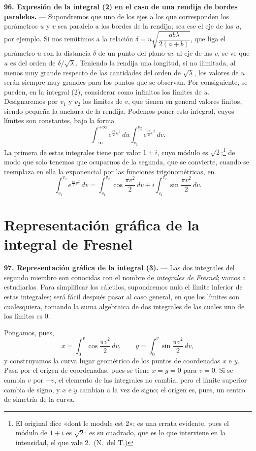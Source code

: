 \noindent\textbf{96. Expresión de la integral (2) en el caso de una
rendija de bordes paralelos.} — Supondremos que uno de los ejes a los que
corresponden los parámetros $u$ y $v$ sea paralelo a los bordes de la
rendija; sea ese el eje de las $u$, por ejemplo. Si nos remitimos a la
relación $\delta=u\sqrt{\dfrac{ab\lambda}{2(a+b)}}$, que liga el parámetro
$u$ con la distancia $\delta$ de un punto del plano $uv$ al eje de las
$v$, se ve que $u$ es del orden de $\delta/\sqrt{\lambda}$. Teniendo la
rendija una longitud, si no ilimitada, al menos muy grande respecto de las
cantidades del orden de $\sqrt{\lambda}$, los valores de $u$ serán siempre
muy grandes para los puntos que se observan. Por consiguiente, se pueden,
en la integral (2), considerar como infinitos los límites de $u$.
Designaremos por $v_1$ y $v_2$ los límites de $v$, que tienen en general
valores finitos, siendo pequeña la anchura de la rendija. Podemos poner
esta integral, cuyos límites son constantes, bajo la forma
\[
\int_{-\infty}^{+\infty} e^{\frac{i\pi}{2}u^2}\,du
\int_{v_1}^{v_2} e^{\frac{i\pi}{2}v^2}\,dv.
\]
La primera de estas integrales tiene por valor $1+i$, cuyo módulo es
$\sqrt2$;\footnote{El original dice «dont le module est 2»; es una errata
evidente, pues el módulo de $1+i$ es $\sqrt2$: es su cuadrado, que es lo
que interviene en la intensidad, el que vale $2$.~(N.~del T.)}
de modo que solo tenemos que ocuparnos de la segunda, que se convierte,
cuando se reemplaza en ella la exponencial por las funciones
trigonométricas, en
\begin{equation}
\int_{v_1}^{v_2} e^{\frac{i\pi}{2}v^2}\,dv =
\int_{v_1}^{v_2}\cos\frac{\pi v^2}{2}\,dv +
i\int_{v_1}^{v_2}\sin\frac{\pi v^2}{2}\,dv.
\tag{3}
\end{equation}

\section{Representación gráfica de la integral de Fresnel}

\noindent\textbf{97. Representación gráfica de la integral (3).} — Las
dos integrales del segundo miembro son conocidas con el nombre de
\emph{integrales de Fresnel}; vamos a estudiarlas. Para simplificar los
cálculos, supondremos nulo el límite inferior de estas integrales; será
fácil después pasar al caso general, en que los límites son cualesquiera,
tomando la suma algebraica de dos integrales de las cuales uno de los
límites es $0$.

Pongamos, pues,
\[
x=\int_0^v \cos\frac{\pi v^2}{2}\,dv,\qquad
y=\int_0^v \sin\frac{\pi v^2}{2}\,dv,
\]
y construyamos la curva lugar geométrico de los puntos de coordenadas $x$
e $y$. Pasa por el origen de coordenadas, pues se tiene $x=y=0$ para
$v=0$. Si se cambia $v$ por $-v$, el elemento de las integrales no
cambia, pero el límite superior cambia de signo, y $x$ e $y$ cambian a la
vez de signo; el origen es, pues, un centro de simetría de la curva.

